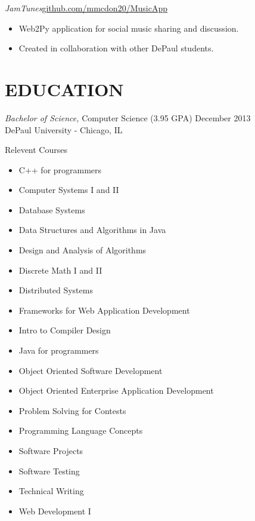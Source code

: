 \documentclass[margin]{res}
\begin{document}
\begin{resume}
                {\sl JamTunes}\hfill \href{http://github.com/mmcdon20/MusicApp}{github.com/mmcdon20/MusicApp}
                \begin{itemize} \itemsep -2pt
                  \item Web2Py application for social music sharing and discussion.
                  \item Created in collaboration with other DePaul students.
                \end{itemize}
                
\section{EDUCATION} 
                {\sl Bachelor of Science,} Computer Science (3.95 GPA) \hfill December 2013 \\
                DePaul University - Chicago, IL 
                \begin{multicols}{2} \centerline{Relevent Courses}
                  \begin{itemize} \itemsep -2pt 
                    \item C++ for programmers
                    \item Computer Systems I and II
                    \item Database Systems
                    \item Data Structures and Algorithms in Java
                    \item Design and Analysis of Algorithms
                    \item Discrete Math I and II
                    \item Distributed Systems
                    \item Frameworks for Web Application Development                  
                    \item Intro to Compiler Design
                    \item Java for programmers
                    \item Object Oriented Software Development
                    \item Object Oriented Enterprise Application Development
                    \item Problem Solving for Contests
                    \item Programming Language Concepts
                    \item Software Projects
                    \item Software Testing
                    \item Technical Writing
                    \item Web Development I
                  \end{itemize}
                \end{multicols}


\end{resume}
\end{document}
